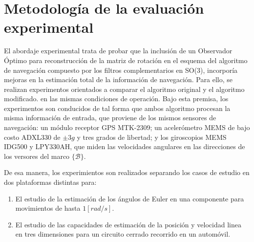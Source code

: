 \documentclass[conference]{IEEEtran}
\newcommand{\marco}[1]{\{\mathcal{#1}\}}
\begin{document}
\section{Metodología de la evaluación experimental}\label{Metodologia}
El abordaje experimental trata de probar que la inclusión de un Observador Óptimo  para reconstrucción de la matriz de rotación en el esquema del algoritmo de navegación compuesto por los filtros complementarios en SO(3), incorporía mejoras en la estimación total de la información de navegación. Para ello, se realizan experimentos orientados a comparar el algoritmo original y el algoritmo modificado. en las mismas condiciones de operación. Bajo esta premisa, los experimentos son conducidos de tal forma que ambos algoritmo procesan la misma información de entrada, que proviene de los mismos  sensores de navegación: un módulo receptor GPS MTK-2309; un acelerómetro MEMS de bajo costo ADXL330 de $\pm3g$ y tres grados de libertad; y los giroscopios MEMS IDG500 y LPY330AH, que miden las velocidades angulares en las direcciones de los versores del marco $\marco{B}$. \par
De esa manera, los experimientos son realizados separando los casos de estudio en dos plataformas distintas para: 
\begin{enumerate}
\item El estudio de la estimación de los ángulos de Euler en una componente para movimientos de hasta $1[rad/s]$.
\item El estudio de las capacidades de estimación de la posición y velocidad linea en tres dimensiones para un circuito cerrado recorrido en un automóvil.
\end{enumerate}
\end{document}
